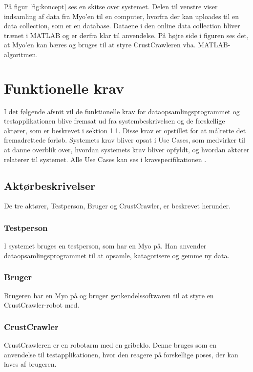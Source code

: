 På figur \ref{fig:koncept} ses en skitse over systemet. Delen til venstre viser indsamling af data fra Myo'en til en computer, hvorfra der kan uploades til en data collection, som er en database.  Dataene i den online data collection bliver trænet i MATLAB og er derfra klar til anvendelse. På højre side i figuren ses det, at Myo'en kan bæres og bruges til at styre CrustCrawleren vha. MATLAB-algoritmen.


\thispagestyle{fancy}
\section{Funktionelle krav}
\label{sec:funktionellekrav}
I det følgende afsnit vil de funktionelle krav for dataopsamlingsprogrammet og testapplikationen blive fremsat ud fra systembeskrivelsen og de forskellige aktører, som er beskrevet i sektion \ref{sec:aktorbeskrivelser}. Disse krav er opstillet for at målrette det fremadrettede forløb.
Systemets krav bliver opsat i Use Cases, som medvirker til at danne overblik over, hvordan systemets krav bliver opfyldt, og hvordan aktører relaterer til systemet. Alle Use Cases kan ses i kravspecifikationen \citep{RefWorks:8}.

\subsection{Aktørbeskrivelser}
\label{sec:aktorbeskrivelser}
De tre aktører, Testperson, Bruger og CrustCrawler, er beskrevet herunder.

\subsubsection{Testperson}
I systemet bruges en testperson, som har en Myo på. Han anvender dataopsamlingsprogrammet til at opsamle, katagorisere og gemme ny data.

\subsubsection{Bruger}
Brugeren har en Myo på og bruger genkendelssoftwaren til at styre en CrustCrawler-robot med.

\subsubsection{CrustCrawler}
CrustCrawleren er en robotarm med en gribeklo. Denne bruges som en anvendelse til testapplikationen, hvor den reagere på forskellige poses, der kan laves af brugeren.

